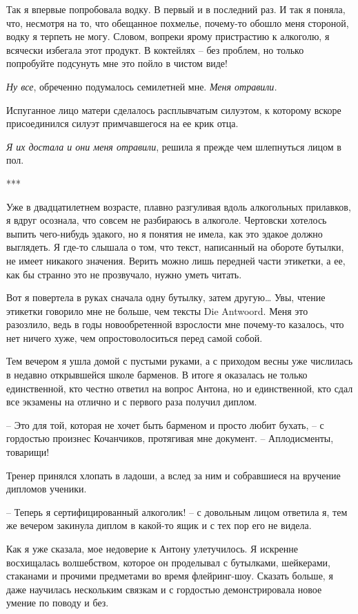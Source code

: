 \documentclass[
]{book}
\begin{document}
Так я впервые попробовала водку. В первый и в последний раз. И так я поняла, что, несмотря на то, что обещанное похмелье, почему-то обошло меня стороной, водку я терпеть не могу. Словом, вопреки ярому пристрастию к алкоголю, я всячески избегала этот продукт. В коктейлях -- без проблем, но только попробуйте подсунуть мне это пойло в чистом виде!

\emph{Ну все}, обреченно подумалось семилетней мне. \emph{Меня отравили.}

Испуганное лицо матери сделалось расплывчатым силуэтом, к которому вскоре присоединился силуэт примчавшегося на ее крик отца.

\emph{Я их достала и они меня отравили}, решила я прежде чем шлепнуться лицом в пол.

***

Уже в двадцатилетнем возрасте, плавно разгуливая вдоль алкогольных прилавков, я вдруг осознала, что совсем не разбираюсь в алкоголе. Чертовски хотелось выпить чего-нибудь эдакого, но я понятия не имела, как это эдакое должно выглядеть. Я где-то слышала о том, что текст, написанный на обороте бутылки, не имеет никакого значения. Верить можно лишь передней части этикетки, а ее, как бы странно это не прозвучало, нужно уметь читать.

Вот я повертела в руках сначала одну бутылку, затем другую\ldots{} Увы, чтение этикетки говорило мне не больше, чем тексты Die Antwoord. Меня это разозлило, ведь в годы новообретенной взрослости мне почему-то казалось, что нет ничего хуже, чем опростоволоситься перед самой собой.

Тем вечером я ушла домой с пустыми руками, а с приходом весны уже числилась в недавно открывшейся школе барменов. В итоге я оказалась не только единственной, кто честно ответил на вопрос Антона, но и единственной, кто сдал все экзамены на отлично и с первого раза получил диплом.

-- Это для той, которая не хочет быть барменом и просто любит бухать, -- с гордостью произнес Кочанчиков, протягивая мне документ. -- Аплодисменты, товарищи!

Тренер принялся хлопать в ладоши, а вслед за ним и собравшиеся на вручение дипломов ученики.

-- Теперь я сертифицированный алкоголик! -- с довольным лицом ответила я, тем же вечером закинула диплом в какой-то ящик и с тех пор его не видела.

Как я уже сказала, мое недоверие к Антону улетучилось. Я искренне восхищалась волшебством, которое он проделывал с бутылками, шейкерами, стаканами и прочими предметами во время флейринг-шоу. Сказать больше, я даже научилась нескольким связкам и с гордостью демонстрировала новое умение по поводу и без.
\end{document}
